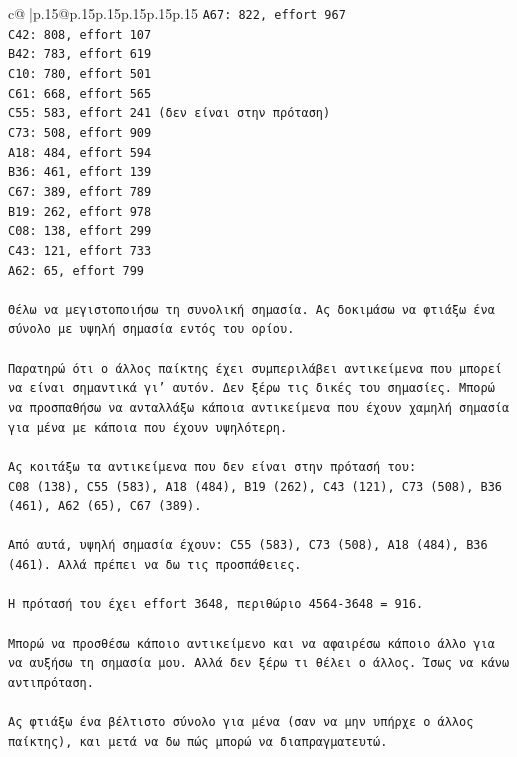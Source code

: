 \documentclass{article}
\begin{document}
{\begin{supertabular}{c@{$\;$}|p{.15\linewidth}@{}p{.15\linewidth}p{.15\linewidth}p{.15\linewidth}p{.15\linewidth}p{.15\linewidth}}
{{{\texttt{A67: 822, effort 967} \\
\texttt{C42: 808, effort 107} \\
\texttt{B42: 783, effort 619} \\
\texttt{C10: 780, effort 501} \\
\texttt{C61: 668, effort 565} \\
\texttt{C55: 583, effort 241 (δεν είναι στην πρόταση)} \\
\texttt{C73: 508, effort 909} \\
\texttt{A18: 484, effort 594} \\
\texttt{B36: 461, effort 139} \\
\texttt{C67: 389, effort 789} \\
\texttt{B19: 262, effort 978} \\
\texttt{C08: 138, effort 299} \\
\texttt{C43: 121, effort 733} \\
\texttt{A62: 65, effort 799} \\
\\ 
\texttt{Θέλω να μεγιστοποιήσω τη συνολική σημασία. Ας δοκιμάσω να φτιάξω ένα σύνολο με υψηλή σημασία εντός του ορίου.} \\
\\ 
\texttt{Παρατηρώ ότι ο άλλος παίκτης έχει συμπεριλάβει αντικείμενα που μπορεί να είναι σημαντικά γι' αυτόν. Δεν ξέρω τις δικές του σημασίες. Μπορώ να προσπαθήσω να ανταλλάξω κάποια αντικείμενα που έχουν χαμηλή σημασία για μένα με κάποια που έχουν υψηλότερη.} \\
\\ 
\texttt{Ας κοιτάξω τα αντικείμενα που δεν είναι στην πρότασή του:} \\
\texttt{C08 (138), C55 (583), A18 (484), B19 (262), C43 (121), C73 (508), B36 (461), A62 (65), C67 (389).} \\
\\ 
\texttt{Από αυτά, υψηλή σημασία έχουν: C55 (583), C73 (508), A18 (484), B36 (461). Αλλά πρέπει να δω τις προσπάθειες.} \\
\\ 
\texttt{Η πρότασή του έχει effort 3648, περιθώριο 4564{-}3648 = 916.} \\
\\ 
\texttt{Μπορώ να προσθέσω κάποιο αντικείμενο και να αφαιρέσω κάποιο άλλο για να αυξήσω τη σημασία μου. Αλλά δεν ξέρω τι θέλει ο άλλος. Ίσως να κάνω αντιπρόταση.} \\
\\ 
\texttt{Ας φτιάξω ένα βέλτιστο σύνολο για μένα (σαν να μην υπήρχε ο άλλος παίκτης), και μετά να δω πώς μπορώ να διαπραγματευτώ.} \\
}}}
\end{supertabular}}
\end{document}
